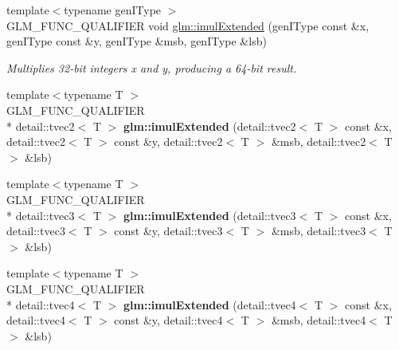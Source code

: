 \begin{DoxyCompactItemize}
\item 
{\footnotesize template$<$typename gen\-I\-Type $>$ }\\G\-L\-M\-\_\-\-F\-U\-N\-C\-\_\-\-Q\-U\-A\-L\-I\-F\-I\-E\-R void \hyperlink{group__core__func__integer_gab0eaec4d0964925429322eebf8dca6d0}{glm\-::imul\-Extended} (gen\-I\-Type const \&x, gen\-I\-Type const \&y, gen\-I\-Type \&msb, gen\-I\-Type \&lsb)
\begin{DoxyCompactList}\small\item\em Multiplies 32-\/bit integers x and y, producing a 64-\/bit result. \end{DoxyCompactList}\item 
\hypertarget{namespaceglm_a040e40acaab0ca3e99f14ca99f83c9b5}{{\footnotesize template$<$typename T $>$ }\\G\-L\-M\-\_\-\-F\-U\-N\-C\-\_\-\-Q\-U\-A\-L\-I\-F\-I\-E\-R \\*
detail\-::tvec2$<$ T $>$ {\bfseries glm\-::imul\-Extended} (detail\-::tvec2$<$ T $>$ const \&x, detail\-::tvec2$<$ T $>$ const \&y, detail\-::tvec2$<$ T $>$ \&msb, detail\-::tvec2$<$ T $>$ \&lsb)}\label{namespaceglm_a040e40acaab0ca3e99f14ca99f83c9b5}

\item 
\hypertarget{namespaceglm_a66babe617fc3264888469469d6e2dede}{{\footnotesize template$<$typename T $>$ }\\G\-L\-M\-\_\-\-F\-U\-N\-C\-\_\-\-Q\-U\-A\-L\-I\-F\-I\-E\-R \\*
detail\-::tvec3$<$ T $>$ {\bfseries glm\-::imul\-Extended} (detail\-::tvec3$<$ T $>$ const \&x, detail\-::tvec3$<$ T $>$ const \&y, detail\-::tvec3$<$ T $>$ \&msb, detail\-::tvec3$<$ T $>$ \&lsb)}\label{namespaceglm_a66babe617fc3264888469469d6e2dede}

\item 
\hypertarget{namespaceglm_ae71642a7ba52d6fa07a85c42bd53490b}{{\footnotesize template$<$typename T $>$ }\\G\-L\-M\-\_\-\-F\-U\-N\-C\-\_\-\-Q\-U\-A\-L\-I\-F\-I\-E\-R \\*
detail\-::tvec4$<$ T $>$ {\bfseries glm\-::imul\-Extended} (detail\-::tvec4$<$ T $>$ const \&x, detail\-::tvec4$<$ T $>$ const \&y, detail\-::tvec4$<$ T $>$ \&msb, detail\-::tvec4$<$ T $>$ \&lsb)}\label{namespaceglm_ae71642a7ba52d6fa07a85c42bd53490b}


\end{DoxyCompactItemize}
